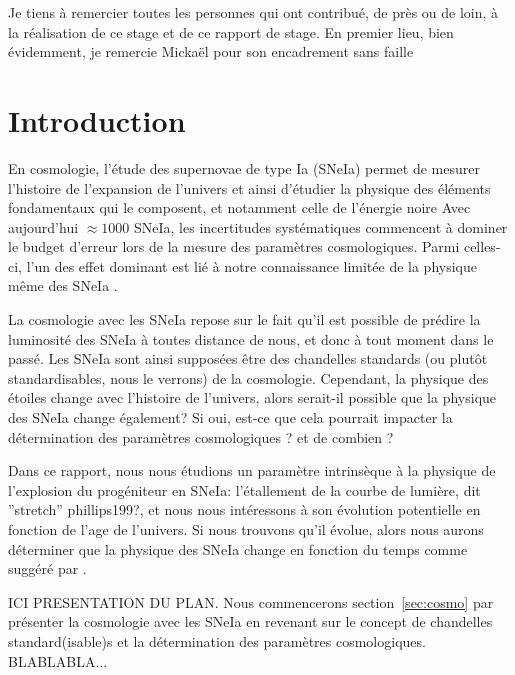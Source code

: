 \documentclass[a4paper, 12pt, svgnames]{article}
\newcommand{\mr}[1]{{\textcolor[rgb]{0.80,0.10,0.1}{#1}}}
\begin{document}

Je tiens à remercier toutes les personnes qui ont contribué, de près ou de loin,
à la réalisation de ce stage et de ce rapport de stage. En premier lieu, bien
évidemment, je remercie Mickaël  pour son encadrement sans faille

\tableofcontents
\newpage

\section{Introduction}\label{sec:int}

\mr{En cosmologie, l'étude des supernovae de type Ia (SNeIa) permet de mesurer
l'histoire de l'expansion de l'univers et ainsi d'étudier la physique des
éléments fondamentaux qui le composent, et notamment celle de l'énergie noire
\cite{perlmutter_measurements_1999,riess_observational_1998}} \mr{Avec
aujourd'hui $\approx1000$ SNeIa, les incertitudes systématiques commencent à
dominer le budget d'erreur lors de la mesure des paramètres
cosmologiques\cite{betoule2014, scolnic_complete2018}. Parmi celles-ci, l'un des
effet dominant est lié à notre connaissance limitée de la physique même des
SNeIa \cite{Sullivan2010,Rigault2013,Rigault2015}.} 

\mr{La cosmologie avec les SNeIa repose sur le fait qu'il est possible de
prédire la luminosité des SNeIa à toutes distance de nous, et donc à tout moment
dans le passé. Les SNeIa sont ainsi supposées être des chandelles standards (ou
plutôt standardisables, nous le verrons) de la cosmologie. Cependant, la
physique des étoiles change avec l'histoire de l'univers, alors serait-il
possible que la physique des SNeIa change également? Si oui, est-ce que cela
pourrait impacter la détermination des paramètres cosmologiques ? et de combien
?} 

Dans ce rapport, nous \mr{nous étudions un paramètre intrinsèque à la physique
de l'explosion du progéniteur en SNeIa: l'étallement de la courbe de lumière,
dit ”stretch” \mr{phillips199?}, et nous nous intéressons à son évolution
potentielle en fonction de l'age de l'univers. Si nous trouvons qu'il évolue,
alors nous aurons déterminer que la physique des SNeIa change en fonction du
temps comme suggéré par
\cite{Howell2009,Rigault2013,childress2014,Rigault2018}.}

\mr{ICI PRESENTATION DU PLAN. Nous commencerons section~\ref{sec:cosmo} par
présenter la cosmologie avec les SNeIa en revenant sur le concept de chandelles
standard(isable)s et la détermination des paramètres cosmologiques.
BLABLABLA...}
\end{document}
